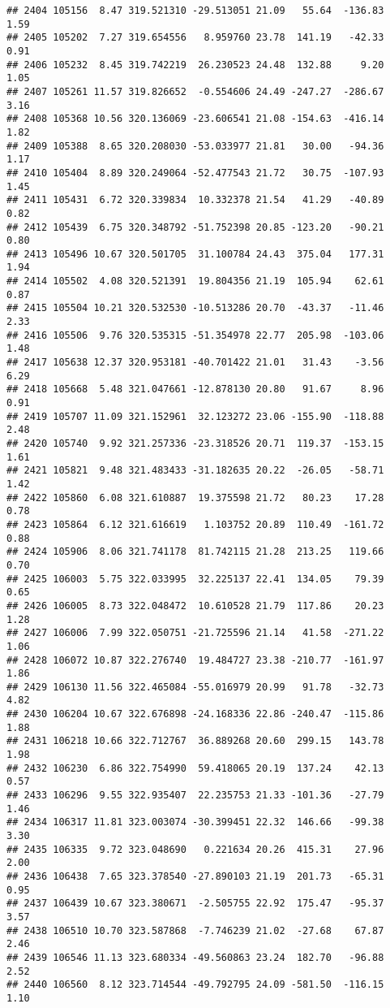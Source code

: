 \documentclass[]{article}
\begin{document}
\begin{verbatim}
## 2404 105156  8.47 319.521310 -29.513051 21.09   55.64  -136.83  1.59
## 2405 105202  7.27 319.654556   8.959760 23.78  141.19   -42.33  0.91
## 2406 105232  8.45 319.742219  26.230523 24.48  132.88     9.20  1.05
## 2407 105261 11.57 319.826652  -0.554606 24.49 -247.27  -286.67  3.16
## 2408 105368 10.56 320.136069 -23.606541 21.08 -154.63  -416.14  1.82
## 2409 105388  8.65 320.208030 -53.033977 21.81   30.00   -94.36  1.17
## 2410 105404  8.89 320.249064 -52.477543 21.72   30.75  -107.93  1.45
## 2411 105431  6.72 320.339834  10.332378 21.54   41.29   -40.89  0.82
## 2412 105439  6.75 320.348792 -51.752398 20.85 -123.20   -90.21  0.80
## 2413 105496 10.67 320.501705  31.100784 24.43  375.04   177.31  1.94
## 2414 105502  4.08 320.521391  19.804356 21.19  105.94    62.61  0.87
## 2415 105504 10.21 320.532530 -10.513286 20.70  -43.37   -11.46  2.33
## 2416 105506  9.76 320.535315 -51.354978 22.77  205.98  -103.06  1.48
## 2417 105638 12.37 320.953181 -40.701422 21.01   31.43    -3.56  6.29
## 2418 105668  5.48 321.047661 -12.878130 20.80   91.67     8.96  0.91
## 2419 105707 11.09 321.152961  32.123272 23.06 -155.90  -118.88  2.48
## 2420 105740  9.92 321.257336 -23.318526 20.71  119.37  -153.15  1.61
## 2421 105821  9.48 321.483433 -31.182635 20.22  -26.05   -58.71  1.42
## 2422 105860  6.08 321.610887  19.375598 21.72   80.23    17.28  0.78
## 2423 105864  6.12 321.616619   1.103752 20.89  110.49  -161.72  0.88
## 2424 105906  8.06 321.741178  81.742115 21.28  213.25   119.66  0.70
## 2425 106003  5.75 322.033995  32.225137 22.41  134.05    79.39  0.65
## 2426 106005  8.73 322.048472  10.610528 21.79  117.86    20.23  1.28
## 2427 106006  7.99 322.050751 -21.725596 21.14   41.58  -271.22  1.06
## 2428 106072 10.87 322.276740  19.484727 23.38 -210.77  -161.97  1.86
## 2429 106130 11.56 322.465084 -55.016979 20.99   91.78   -32.73  4.82
## 2430 106204 10.67 322.676898 -24.168336 22.86 -240.47  -115.86  1.88
## 2431 106218 10.66 322.712767  36.889268 20.60  299.15   143.78  1.98
## 2432 106230  6.86 322.754990  59.418065 20.19  137.24    42.13  0.57
## 2433 106296  9.55 322.935407  22.235753 21.33 -101.36   -27.79  1.46
## 2434 106317 11.81 323.003074 -30.399451 22.32  146.66   -99.38  3.30
## 2435 106335  9.72 323.048690   0.221634 20.26  415.31    27.96  2.00
## 2436 106438  7.65 323.378540 -27.890103 21.19  201.73   -65.31  0.95
## 2437 106439 10.67 323.380671  -2.505755 22.92  175.47   -95.37  3.57
## 2438 106510 10.70 323.587868  -7.746239 21.02  -27.68    67.87  2.46
## 2439 106546 11.13 323.680334 -49.560863 23.24  182.70   -96.88  2.52
## 2440 106560  8.12 323.714544 -49.792795 24.09 -581.50  -116.15  1.10

\end{verbatim}
\end{document}

